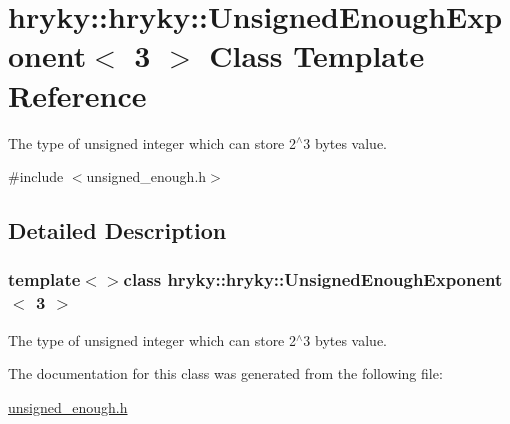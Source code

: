 \hypertarget{classhryky_1_1hryky_1_1_unsigned_enough_exponent_3_013_01_4}{\section{hryky\-:\-:hryky\-:\-:Unsigned\-Enough\-Exponent$<$ 3 $>$ Class Template Reference}
\label{classhryky_1_1hryky_1_1_unsigned_enough_exponent_3_013_01_4}
}


The type of unsigned integer which can store 2$^\wedge$3 bytes value.  




{\ttfamily \#include $<$unsigned\-\_\-enough.\-h$>$}



\subsection{Detailed Description}
\subsubsection*{template$<$$>$class hryky\-::hryky\-::\-Unsigned\-Enough\-Exponent$<$ 3 $>$}

The type of unsigned integer which can store 2$^\wedge$3 bytes value. 

The documentation for this class was generated from the following file\-:\begin{DoxyCompactItemize}
\item 
\hyperlink{unsigned__enough_8h}{unsigned\-\_\-enough.\-h}\end{DoxyCompactItemize}
